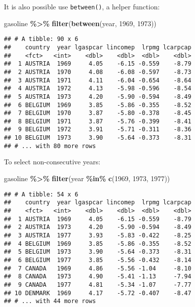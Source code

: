 \documentclass[
]{article}
\newenvironment{Shaded}{\begin{snugshade}}{\end{snugshade}}
\newcommand{\DecValTok}[1]{\textcolor[rgb]{0.00,0.00,0.81}{#1}}
\newcommand{\KeywordTok}[1]{\textcolor[rgb]{0.13,0.29,0.53}{\textbf{#1}}}
\newcommand{\NormalTok}[1]{#1}
\newcommand{\OperatorTok}[1]{\textcolor[rgb]{0.81,0.36,0.00}{\textbf{#1}}}
\newcommand{\StringTok}[1]{\textcolor[rgb]{0.31,0.60,0.02}{#1}}
\begin{document}
It is also possible use \texttt{between()}, a helper function:

\begin{Shaded}
\begin{Highlighting}[]
\NormalTok{gasoline }\OperatorTok{\%\textgreater{}\%}\StringTok{ }\KeywordTok{filter}\NormalTok{(}\KeywordTok{between}\NormalTok{(year, }\DecValTok{1969}\NormalTok{, }\DecValTok{1973}\NormalTok{))}
\end{Highlighting}
\end{Shaded}

\begin{verbatim}
## # A tibble: 90 x 6
##    country  year lgaspcar lincomep  lrpmg lcarpcap
##    <fct>   <int>    <dbl>    <dbl>  <dbl>    <dbl>
##  1 AUSTRIA  1969     4.05    -6.15 -0.559    -8.79
##  2 AUSTRIA  1970     4.08    -6.08 -0.597    -8.73
##  3 AUSTRIA  1971     4.11    -6.04 -0.654    -8.64
##  4 AUSTRIA  1972     4.13    -5.98 -0.596    -8.54
##  5 AUSTRIA  1973     4.20    -5.90 -0.594    -8.49
##  6 BELGIUM  1969     3.85    -5.86 -0.355    -8.52
##  7 BELGIUM  1970     3.87    -5.80 -0.378    -8.45
##  8 BELGIUM  1971     3.87    -5.76 -0.399    -8.41
##  9 BELGIUM  1972     3.91    -5.71 -0.311    -8.36
## 10 BELGIUM  1973     3.90    -5.64 -0.373    -8.31
## # ... with 80 more rows
\end{verbatim}

To select non-consecutive years:

\begin{Shaded}
\begin{Highlighting}[]
\NormalTok{gasoline }\OperatorTok{\%\textgreater{}\%}\StringTok{ }\KeywordTok{filter}\NormalTok{(year }\OperatorTok{\%in\%}\StringTok{ }\KeywordTok{c}\NormalTok{(}\DecValTok{1969}\NormalTok{, }\DecValTok{1973}\NormalTok{, }\DecValTok{1977}\NormalTok{))}
\end{Highlighting}
\end{Shaded}

\begin{verbatim}
## # A tibble: 54 x 6
##    country  year lgaspcar lincomep  lrpmg lcarpcap
##    <fct>   <int>    <dbl>    <dbl>  <dbl>    <dbl>
##  1 AUSTRIA  1969     4.05    -6.15 -0.559    -8.79
##  2 AUSTRIA  1973     4.20    -5.90 -0.594    -8.49
##  3 AUSTRIA  1977     3.93    -5.83 -0.422    -8.25
##  4 BELGIUM  1969     3.85    -5.86 -0.355    -8.52
##  5 BELGIUM  1973     3.90    -5.64 -0.373    -8.31
##  6 BELGIUM  1977     3.85    -5.56 -0.432    -8.14
##  7 CANADA   1969     4.86    -5.56 -1.04     -8.10
##  8 CANADA   1973     4.90    -5.41 -1.13     -7.94
##  9 CANADA   1977     4.81    -5.34 -1.07     -7.77
## 10 DENMARK  1969     4.17    -5.72 -0.407    -8.47
## # ... with 44 more rows
\end{verbatim}
\end{document}
